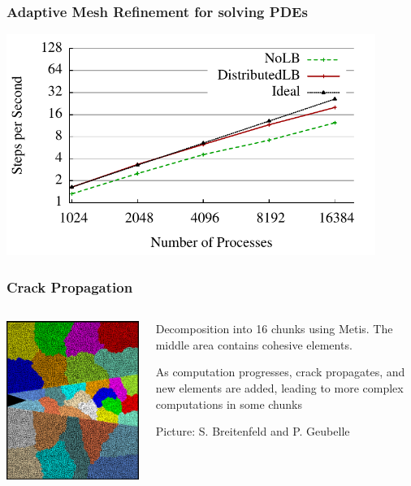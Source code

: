 
\begin{frame}
\frametitle{Adaptive Mesh Refinement for solving PDEs}
\includegraphics[width=0.9\textwidth]{../figures/amr_scaling_distlb.pdf}
\end{frame}




\begin{frame}[fragile]
\frametitle{Crack Propagation}
\begin{columns}
\begin{column}{0.5\textwidth}
\includegraphics[width=\textwidth]{../figures/chunkGraph16}
\end{column}
\begin{column}{0.5\textwidth}
Decomposition into 16 chunks using Metis. The middle area contains cohesive elements.

As computation progresses, crack propagates, and new elements are added, leading to more complex computations in some chunks

Picture: S. Breitenfeld and P. Geubelle
\end{column}
\end{columns}
\end{frame}


